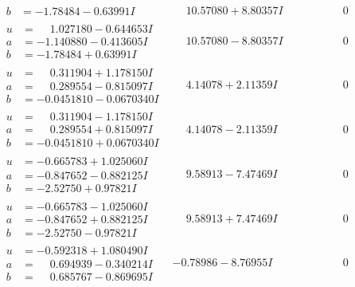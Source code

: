 \documentclass[1p]{elsarticle_modified}
\theoremstyle{definition}
\begin{document}
$$\begin{array}{c|c|c}
\begin{aligned}
b &= -1.78484 - 0.63991 I\end{aligned}
 & \phantom{-}10.57080 + 8.80357 I & \phantom{-0.000000 } 0 \\ \hline\begin{aligned}
u &= \phantom{-}1.027180 - 0.644653 I \\
a &= -1.140880 - 0.413605 I \\
b &= -1.78484 + 0.63991 I\end{aligned}
 & \phantom{-}10.57080 - 8.80357 I & \phantom{-0.000000 } 0 \\ \hline\begin{aligned}
u &= \phantom{-}0.311904 + 1.178150 I \\
a &= \phantom{-}0.289554 - 0.815097 I \\
b &= -0.0451810 - 0.0670340 I\end{aligned}
 & \phantom{-}4.14078 + 2.11359 I & \phantom{-0.000000 } 0 \\ \hline\begin{aligned}
u &= \phantom{-}0.311904 - 1.178150 I \\
a &= \phantom{-}0.289554 + 0.815097 I \\
b &= -0.0451810 + 0.0670340 I\end{aligned}
 & \phantom{-}4.14078 - 2.11359 I & \phantom{-0.000000 } 0 \\ \hline\begin{aligned}
u &= -0.665783 + 1.025060 I \\
a &= -0.847652 - 0.882125 I \\
b &= -2.52750 + 0.97821 I\end{aligned}
 & \phantom{-}9.58913 - 7.47469 I & \phantom{-0.000000 } 0 \\ \hline\begin{aligned}
u &= -0.665783 - 1.025060 I \\
a &= -0.847652 + 0.882125 I \\
b &= -2.52750 - 0.97821 I\end{aligned}
 & \phantom{-}9.58913 + 7.47469 I & \phantom{-0.000000 } 0 \\ \hline\begin{aligned}
u &= -0.592318 + 1.080490 I \\
a &= \phantom{-}0.694939 - 0.340214 I \\
b &= \phantom{-}0.685767 - 0.869695 I\end{aligned}
 & -0.78986 - 8.76955 I & \phantom{-0.000000 } 0 \\ \hline\begin{aligned}

\end{aligned}
\end{array}$$
\end{document}
